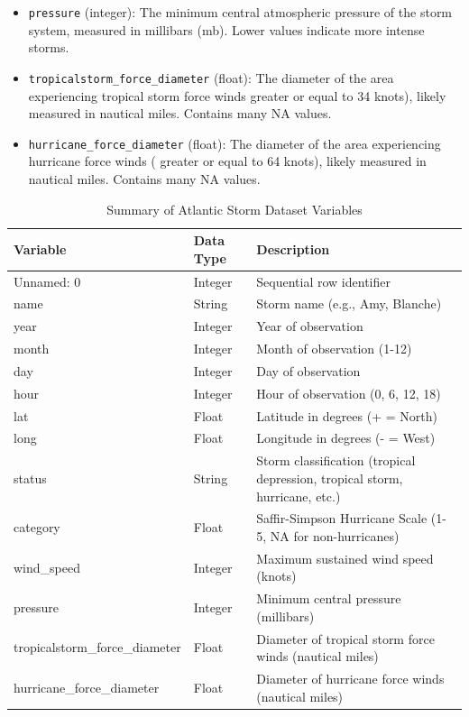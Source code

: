 \begin{itemize}
	\item \texttt{pressure} (integer): The minimum central atmospheric pressure of the storm system, measured in millibars (mb). Lower values indicate more intense storms.
	
	\item \texttt{tropicalstorm\_force\_diameter} (float): The diameter of the area experiencing tropical storm force winds greater or equal to 34 knots), likely measured in nautical miles. Contains many NA values.
	
	\item \texttt{hurricane\_force\_diameter} (float): The diameter of the area experiencing hurricane force winds ( greater or equal to 64 knots), likely measured in nautical miles. Contains many NA values.
\end{itemize}

\begin{table}[htbp]
	\centering
	\caption{Summary of Atlantic Storm Dataset Variables}
	\begin{tabular}{|p{4cm}|p{3cm}|p{7cm}|}
		\hline
		\textbf{Variable} & \textbf{Data Type} & \textbf{Description} \\
		\hline
		Unnamed: 0 & Integer & Sequential row identifier \\
		\hline
		name & String & Storm name (e.g., Amy, Blanche) \\
		\hline
		year & Integer & Year of observation \\
		\hline
		month & Integer & Month of observation (1-12) \\
		\hline
		day & Integer & Day of observation \\
		\hline
		hour & Integer & Hour of observation (0, 6, 12, 18) \\
		\hline
		lat & Float & Latitude in degrees (+ = North) \\
		\hline
		long & Float & Longitude in degrees (- = West) \\
		\hline
		status & String & Storm classification (tropical depression, tropical storm, hurricane, etc.) \\
		\hline
		category & Float & Saffir-Simpson Hurricane Scale (1-5, NA for non-hurricanes) \\
		\hline
		wind\_speed & Integer & Maximum sustained wind speed (knots) \\
		\hline
		pressure & Integer & Minimum central pressure (millibars) \\
		\hline
		tropicalstorm\_force\_diameter & Float & Diameter of tropical storm force winds (nautical miles) \\
		\hline
		hurricane\_force\_diameter & Float & Diameter of hurricane force winds (nautical miles) \\
		\hline
	\end{tabular}
\end{table}

